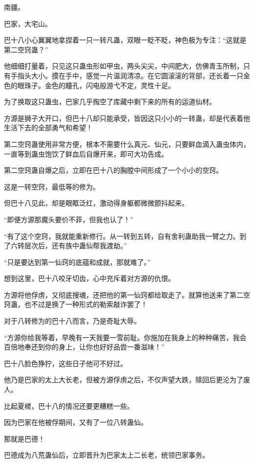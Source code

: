 
\begin{this_body}

南疆。

巴家，大宅山。

巴十八小心翼翼地拿捏着一只一转凡蛊，双眼一眨不眨，神色极为专注：“这就是第二空窍蛊？”

他细细打量着，只见这只蛊虫形如甲虫，两头尖尖，中间肥大，仿佛青玉所制，只有手指头大小。摸在手中，感觉一片温润清凉。在它圆滚滚的背部，还长着一只金色的眼珠子。金色的瞳孔，闪电般游弋不定，灵性十足。

为了换取这只蛊虫，巴家几乎掏空了库藏中剩下来的所有的运道仙材。

方源是狮子大开口，但巴十八却只能承受，皆因这只小小的一转蛊，却是代表着他生活下去的全部勇气和希望！

第二空窍蛊使用非常方便，根本不需要什么真元、仙元，只要鲜血滴入蛊虫体内，一直等到蛊虫饱饮了鲜血后自爆开来，即可大功告成。

第二空窍蛊自爆之后，立即在巴十八的胸膛中间形成了一个小小的空窍。

这是一转空窍，最低等的修为。

但巴十八见此，却是眼眶泛红，激动得身躯都微微颤抖起来。

“即便方源那魔头要价不菲，但我也认了！”

“有了这个空窍，我就能重新修行。从一转到五转，自有舍利蛊助我一臂之力。到了六转层次后，还有族中蛊仙帮我渡劫。”

“只是要达到第一仙窍的底蕴和成就，那就难了。”

想到这里，巴十八咬牙切齿，心中充斥着对方源的仇恨。

方源将他俘虏，又彻底搜魂，还把他的第一仙窍都给取走了。就算他送来了第二空窍蛊，也不过是换了一种形式的勒索敲诈罢了！

对于八转修为的巴十八而言，乃是奇耻大辱。

“方源你给我等着，早晚有一天我要一雪前耻。你施加在我身上的种种痛苦，我会百倍地奉还到你的身上，让你也好好品尝一番滋味！”

巴十八脸色狰狞，这些日子他可不好过。

他乃是巴家的太上大长老，但被方源俘虏之后，不仅声望大跌，赎回后更沦为了废人。

比起夏槎，巴十八的情况还要更糟糕一些。

因为巴家在他被俘期间，又有了一位八转蛊仙。

那就是巴德！

巴德成为八荒蛊仙后，立即晋升为巴家太上二长老，统领巴家事务。


\end{this_body}
